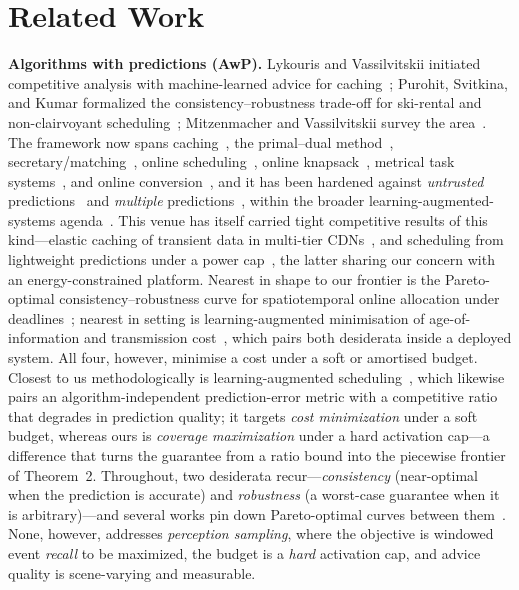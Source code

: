 ﻿\documentclass[lettersize,journal]{IEEEtran}
\begin{document}
\section{Related Work}\label{sec:related}
\textbf{Algorithms with predictions (AwP).} Lykouris and Vassilvitskii initiated competitive analysis with machine-learned advice for caching~\cite{lv}; Purohit, Svitkina, and Kumar formalized the consistency--robustness trade-off for ski-rental and non-clairvoyant scheduling~\cite{purohit}; Mitzenmacher and Vassilvitskii survey the area~\cite{mv}. The framework now spans caching~\cite{rohatgi,wei}, the primal--dual method~\cite{bamas}, secretary/matching~\cite{antoniadis}, online scheduling~\cite{lattanzi}, online knapsack~\cite{im}, metrical task systems~\cite{christianson}, and online conversion~\cite{sun}, and it has been hardened against \emph{untrusted} predictions~\cite{angelopoulos,antoniadisM} and \emph{multiple} predictions~\cite{anand2}, within the broader learning-augmented-systems agenda~\cite{kraska,anand,mbloom}. This venue has itself carried tight competitive results of this kind---elastic caching of transient data in multi-tier CDNs~\cite{tpdscache}, and scheduling from lightweight predictions under a power cap~\cite{hpcpred}, the latter sharing our concern with an energy-constrained platform. Nearest in shape to our frontier is the Pareto-optimal consistency--robustness curve for spatiotemporal online allocation under deadlines~\cite{stclip}; nearest in setting is learning-augmented minimisation of age-of-information and transmission cost~\cite{awpaoi}, which pairs both desiderata inside a deployed system. All four, however, minimise a cost under a soft or amortised budget. Closest to us methodologically is learning-augmented scheduling~\cite{lascheduling}, which likewise pairs an algorithm-independent prediction-error metric with a competitive ratio that degrades in prediction quality; it targets \emph{cost minimization} under a soft budget, whereas ours is \emph{coverage maximization} under a hard activation cap---a difference that turns the guarantee from a ratio bound into the piecewise frontier of Theorem~2. Throughout, two desiderata recur---\emph{consistency} (near-optimal when the prediction is accurate) and \emph{robustness} (a worst-case guarantee when it is arbitrary)---and several works pin down Pareto-optimal curves between them~\cite{sun,christianson}. None, however, addresses \emph{perception sampling}, where the objective is windowed event \emph{recall} to be maximized, the budget is a \emph{hard} activation cap, and advice quality is scene-varying and measurable.
\end{document}
